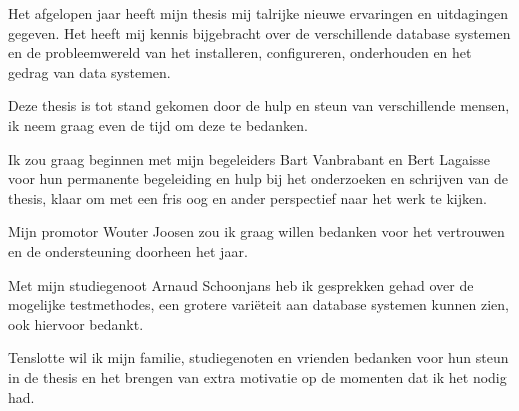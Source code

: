\documentclass[master=cws,masteroption=gs]{kulemt}
\begin{document}
\setlength{\parindent}{0cm}
\setlength{\parskip}{\baselineskip}

\begin{preface}
Het afgelopen jaar heeft mijn thesis mij talrijke nieuwe ervaringen en uitdagingen gegeven. Het heeft mij kennis bijgebracht over de verschillende database systemen en de probleemwereld van het installeren, configureren, onderhouden en het gedrag van data systemen. 

Deze thesis is tot stand gekomen door de hulp en steun van verschillende mensen, ik neem graag even de tijd om deze te bedanken. 

Ik zou graag beginnen met mijn begeleiders Bart Vanbrabant en Bert Lagaisse voor hun permanente begeleiding en hulp bij het onderzoeken en schrijven van de thesis, klaar om met een fris oog en ander perspectief naar het werk te kijken. 

Mijn promotor Wouter Joosen zou ik graag willen bedanken voor het vertrouwen en de ondersteuning doorheen het jaar. 

Met mijn studiegenoot Arnaud Schoonjans heb ik gesprekken gehad over de mogelijke testmethodes, een grotere variëteit aan database systemen kunnen zien, ook hiervoor bedankt. 

Tenslotte wil ik mijn familie, studiegenoten en vrienden bedanken voor hun steun in de thesis en het brengen van extra motivatie op de momenten dat ik het nodig had. 

  
\end{preface}

\tableofcontents*
\begin{abstract}

\end{abstract}

%

\mainmatter









\appendixpage*          %
\appendix


%
%


%
%

\backmatter

\printbibliography
\end{document}
